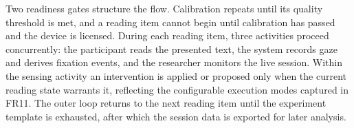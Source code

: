 Two readiness gates structure the flow.
Calibration repeats until its quality threshold is met, and a reading item cannot begin until calibration has passed and the device is licensed.
During each reading item, three activities proceed concurrently: the participant reads the presented text, the system records gaze and derives fixation events, and the researcher monitors the live session.
Within the sensing activity an intervention is applied or proposed only when the current reading state warrants it, reflecting the configurable execution modes captured in FR11.
The outer loop returns to the next reading item until the experiment template is exhausted, after which the session data is exported for later analysis.



